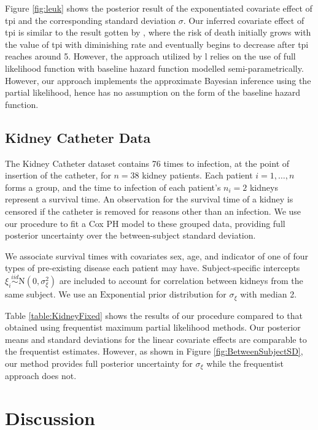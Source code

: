 \documentclass[ba]{imsart}
\begin{document}
Figure \ref{fig:leuk} shows the posterior result of the exponentiated covariate effect of tpi and the corresponding standard deviation $\sigma$. Our inferred covariate effect of tpi is similar to the result gotten by \cite{inlacoxph}, where the risk of death initially grows with the value of tpi with diminishing rate and eventually begins to decrease after tpi reaches around 5. However, the approach utilized by \cite{inlacoxph}l relies on the use of full likelihood function with baseline hazard function modelled semi-parametrically. However, our approach implements the approximate Bayesian inference using the partial likelihood, hence has no assumption on the form of the baseline hazard function. 


\subsection{Kidney Catheter Data}\label{subsec:kidney}

The Kidney Catheter dataset contains 76 times to infection, at the point of insertion of the catheter, for $n = 38$  kidney patients. Each patient $i=1,\ldots,n$ forms a group, and the time to infection of each patient's $n_{i} = 2$ kidneys represent a survival time. An observation for the survival time of a kidney is censored if the catheter is removed for reasons other than an infection. We use our procedure to fit a Cox PH model to these grouped data, providing full posterior uncertainty over the between-subject standard deviation.

We associate survival times with covariates sex, age, and indicator of one of four types of pre-existing disease each patient may have. Subject-specific intercepts $\xi_{i}\overset{iid}{\sim}\text{N}(0,\sigma^{2}_{\xi})$ are included to account for correlation between kidneys from the same subject. We use an $\text{Exponential}$ prior distribution for $\sigma_{\xi}$ with median 2.

Table \ref{table:KidneyFixed} shows the results of our procedure compared to that obtained using frequentist maximum partial likelihood methods. Our posterior means and standard deviations for the linear covariate effects are comparable to the frequentist estimates. However, as shown in Figure \ref{fig:BetweenSubjectSD}, our method provides full posterior uncertainty for $\sigma_{\xi}$ while the frequentist approach does not. 

\section{Discussion}\label{sec:discussion}
\end{document}
